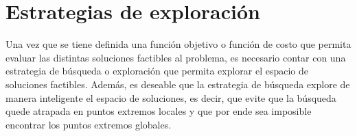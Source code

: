 %
%
%
%

\section{Estrategias de exploración}

Una vez que se tiene definida una función objetivo o función de costo que permita evaluar las distintas soluciones factibles al problema, es necesario contar con una estrategia de búsqueda o exploración que permita explorar el espacio de soluciones factibles. Además, es deseable que la estrategia de búsqueda explore de manera inteligente el espacio de soluciones, es decir, que evite que la búsqueda quede atrapada en puntos extremos locales y que por ende sea imposible encontrar los puntos extremos globales.

